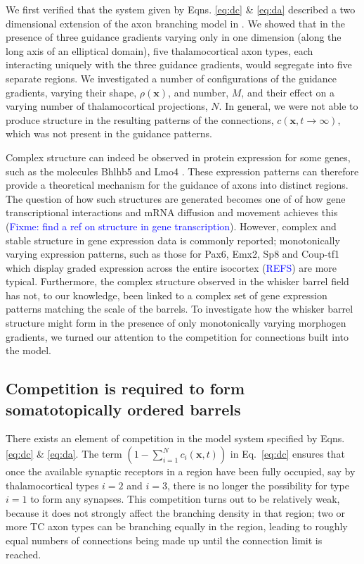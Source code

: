 \documentclass[a4paper,11pt]{article}
\newcommand{\cmnt}[1]{\textcolor{blue}{#1}}
\newcommand{\mb}[1]{\mathbf{#1}}
\begin{document}
We first verified that the system given by Eqns. \ref{eq:dc} \&
\ref{eq:da} described a two dimensional extension of the axon
branching model in \citet{karbowski_model_2004}. We showed that in the presence of
three guidance gradients varying only in one dimension (along the long axis of
an elliptical domain), five thalamocortical axon types, each interacting
uniquely with the three guidance gradients, would segregate into five separate
regions. We investigated a number of configurations of the guidance gradients,
varying their shape, $\rho(\mb{x})$, and number, $M$, and their effect on a
varying number of thalamocortical projections, $N$. In general, we were not
able to produce structure in the resulting patterns of the connections,
$c(\mb{x},t\rightarrow\infty)$, which was not present in the guidance
patterns.

Complex structure can indeed be observed in protein expression for some genes,
such as the molecules Bhlhb5 \citep{joshi_bhlhb5_2008} and Lmo4
\citep{cederquist_lmo4_2013,greig_molecular_2013}. These expression patterns can therefore
provide a theoretical mechanism for the guidance of axons into distinct
regions. The question of how such structures are generated becomes one of of
how gene transcriptional interactions and mRNA diffusion and movement achieves
this (\cmnt{Fixme: find a ref on structure in gene transcription}). However,
complex and stable structure in gene expression data is commonly reported;
monotonically varying expression patterns, such as those for Pax6, Emx2, Sp8
and Coup-tf1 which display graded expression across the entire isocortex
(\cmnt{REFS}) are more typical. Furthermore, the complex structure observed in
the whisker barrel field has not, to our knowledge, been linked to a complex
set of gene expression patterns matching the scale of the barrels. To
investigate how the whisker barrel structure might form in the presence of
only monotonically varying morphogen gradients, we turned our attention to the
competition for connections built into the model.


\subsection*{Competition is required to form somatotopically ordered barrels}

There exists an element of competition in the model system specified by
Eqns. \ref{eq:dc} \& \ref{eq:da}. The term $\left(1 -
\sum_{i=1}^{N} c_i(\mb{x}, t)\right)$ in Eq.~\ref{eq:dc} ensures that once the available synaptic
receptors in a region have been fully occupied, say by thalamocortical types
$i=2$ and $i=3$, there is no longer the possibility for type $i=1$ to form any
synapses. This competition turns out to be relatively weak, because it does
not strongly affect the branching density in that region; two or more TC axon
types can be branching equally in the region, leading to roughly equal numbers
of connections being made up until the connection limit is reached.
\end{document}
